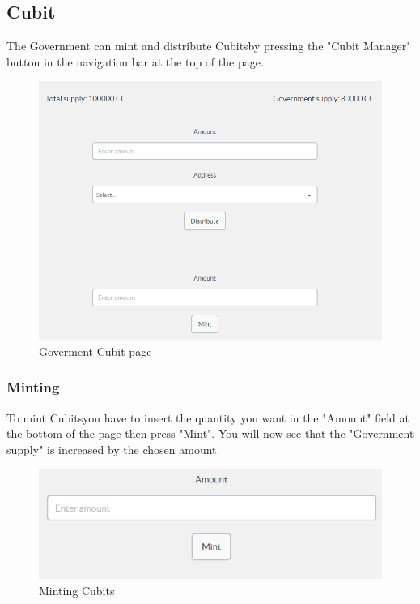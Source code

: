 	\subsection{Cubit}
	The Government can mint and distribute Cubits\glosp by pressing the "Cubit 
	Manager" button in the navigation bar at the top of the page.
	\begin{figure}[H]
		\includegraphics[width=15cm]{res/images/cubit_manager.png}
		\centering
		\caption{Goverment Cubit page}
	\end{figure}
		\subsubsection{Minting}
		To mint Cubits\glosp you have to insert the quantity you want in the 
		"Amount" field at the bottom of the page then press "Mint". You will 
		now see that the "Government supply" is increased by the chosen amount.
		\begin{figure}[H]
			\includegraphics[width=15cm]{res/images/minting_cubits.png}
			\centering
			\caption{Minting Cubits}
		\end{figure}
